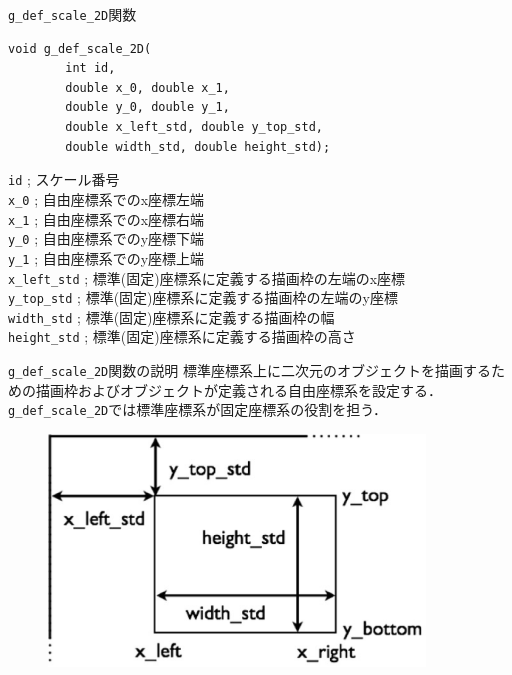 \documentclass[platex,a4paper,12pt]{jsarticle}%
\begin{document}
\begin{itembox}[l]{\texttt{g\_def\_scale\_2D}関数}
\begin{verbatim}
void g_def_scale_2D(
        int id,
        double x_0, double x_1,
        double y_0, double y_1,
        double x_left_std, double y_top_std,
        double width_std, double height_std);
\end{verbatim}
\verb|id| ; スケール番号 \\
\verb|x_0| ; 自由座標系でのx座標左端 \\
\verb|x_1| ; 自由座標系でのx座標右端 \\
\verb|y_0| ; 自由座標系でのy座標下端 \\
\verb|y_1| ; 自由座標系でのy座標上端 \\
\verb|x_left_std| ; 標準(固定)座標系に定義する描画枠の左端のx座標 \\
\verb|y_top_std| ; 標準(固定)座標系に定義する描画枠の左端のy座標 \\
\verb|width_std| ; 標準(固定)座標系に定義する描画枠の幅 \\
\verb|height_std| ; 標準(固定)座標系に定義する描画枠の高さ
\end{itembox}

\begin{itembox}[l]{\texttt{g\_def\_scale\_2D}関数の説明}
標準座標系上に二次元のオブジェクトを描画するための描画枠およびオブジェクトが定義される自由座標系を設定する．
\verb|g_def_scale_2D|では標準座標系が固定座標系の役割を担う．
\end{itembox}

\begin{figure}[htb]
\centering
\includegraphics[width=100mm]{Canvas_g_def_scale_2D.eps}
\end{figure}
\end{document}
